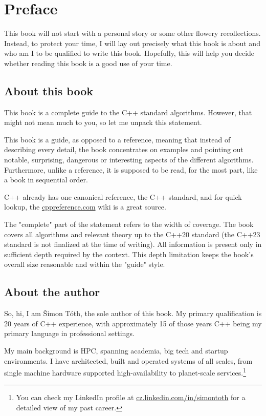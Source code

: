 \chapter{Preface}

This book will not start with a personal story or some other flowery recollections. Instead, to protect your time, I will lay out precisely what this book is about and who am I to be qualified to write this book. Hopefully, this will help you decide whether reading this book is a good use of your time.

\section{About this book}

This book is a complete guide to the C++ standard algorithms. However, that might not mean much to you, so let me unpack this statement.

This book is a guide, as opposed to a reference, meaning that instead of describing every detail, the book concentrates on examples and pointing out notable, surprising, dangerous or interesting aspects of the different algorithms. Furthermore, unlike a reference, it is supposed to be read, for the most part, like a book in sequential order.

C++ already has one canonical reference, the C++ standard, and for quick lookup, the \url{cppreference.com} wiki is a great source.

The "complete" part of the statement refers to the width of coverage. The book covers all algorithms and relevant theory up to the C++20 standard (the C++23 standard is not finalized at the time of writing). All information is present only in sufficient depth required by the context. This depth limitation keeps the book's overall size reasonable and within the "guide" style.

\section{About the author}

So, hi, I am Šimon Tóth, the sole author of this book. My primary qualification is 20 years of C++ experience, with approximately 15 of those years C++ being my primary language in professional settings.

My main background is HPC, spanning academia, big tech and startup environments. I have architected, built and operated systems of all scales, from single machine hardware supported high-availability to planet-scale services.\footnote{You can check my LinkedIn profile at \url{cz.linkedin.com/in/simontoth} for a detailed view of my past career.}

